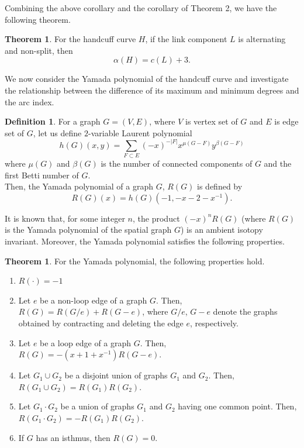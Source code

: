 \documentclass{article}
\theoremstyle{definition}
\newtheorem{defn}[thm]{Definition}
\theoremstyle{theorem}
\newtheorem{theorem}[thm]{Theorem}
\theoremstyle{proposition}
\theoremstyle{corollary}
\begin{document}
Combining the above corollary and the corollary of Theorem 2, we have the following theorem.

\begin{theorem}
    For the handcuff curve $H$, if the link component $L$ is alternating and non-split, then
    \[ \alpha(H) = c(L)+3. \]
\end{theorem}

We now consider the Yamada polynomial of the handcuff curve and investigate the relationship between the difference of its maximum and minimum degrees and the arc index.

\begin{defn}
    For a graph $G=(V, E)$, where $V$ is vertex set of $G$ and $E$ is edge set of $G$, let us define $2$-variable Laurent polynomial
    \[ h(G)(x, y) = \sum_{F \subset E} (-x)^{-|F|} x^{\mu(G-F)} y^{\beta(G-F)} \]
    where $\mu(G)$ and $\beta(G)$ is the number of connected components of $G$ and the first Betti number of $G$. \\
    Then, the Yamada polynomial of a graph $G$, $R(G)$ is defined by
    \[ R(G)(x) = h(G)(-1, -x-2-x^{-1}). \]
\end{defn}

It is known that, for some integer $n$, the product $(-x)^n R(G)$ (where $R(G)$ is the Yamada polynomial of the spatial graph $G$) is an ambient isotopy invariant. Moreover, the Yamada polynomial satisfies the following properties.

\begin{theorem}
    For the Yamada polynomial, the following properties hold.
    \begin{enumerate}
        \item $R( \cdot ) = -1$
        \item Let $e$ be a non-loop edge of a graph $G$. Then, $R(G) = R(G / e) + R(G - e)$, where $G/e$, $G-e$ denote the graphs obtained by contracting and deleting the edge $e$, respectively.
        \item Let $e$ be a loop edge of a graph $G$. Then, $R(G) = -(x+1+x^{-1}) R(G-e)$.
        \item Let $G_1 \cup G_2$ be a disjoint union of graphs $G_1$ and $G_2$. Then, $R(G_1 \cup G_2) = R(G_1)R(G_2)$.
        \item Let $G_1 \cdot G_2$ be a union of graphs $G_1$ and $G_2$ having one common point. Then, $R(G_1 \cdot G_2) = -R(G_1)R(G_2)$.
        \item If $G$ has an isthmus, then $R(G)=0$.
    \end{enumerate}
\end{theorem}
\end{document}
